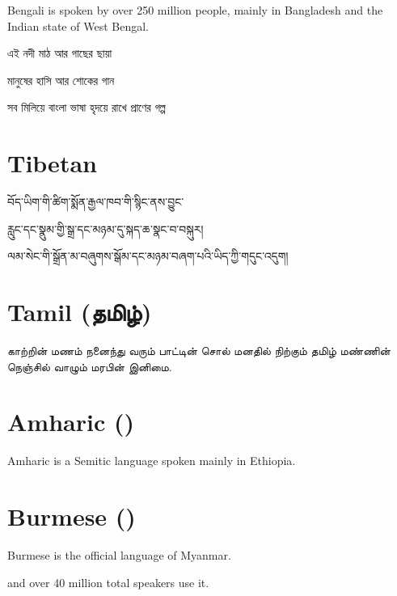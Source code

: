 \documentclass[a4paper,twoside]{article}
\begin{document}
Bengali is spoken by over 250 million people, mainly in Bangladesh and the Indian state of West Bengal.

\textbengali{এই নদী মাঠ আর গাছের ছায়া}

\textbengali{মানুষের হাসি আর শোকের গান}

\textbengali{সব মিলিয়ে বাংলা ভাষা হৃদয়ে রাখে প্রাণের গল্প}

\section{Tibetan}\label{tibetan}

\texttibetan{བོད་ཡིག་གི་ཚིག་སྨོན་རྒྱལ་ཁབ་གི་སྙིང་ནས་བྱུང་}

\texttibetan{རླུང་དང་སྣུམ་གྱི་སྒྲ་དང་མཉམ་དུ་སྐད་ཆ་སྣང་བ་བསྐུར།}

\texttibetan{ལམ་སེང་གི་སྒྲོན་མ་བཞུགས་སྒོམ་དང་མཉམ་བཞག་པའི་ཡིད་ཀྱི་གདུང་འདུག།}

\section{Tamil (\texttamil{தமிழ்})}\label{tamil-tmilll}

\texttamil{காற்றின் மணம் நனைந்து வரும்
பாட்டின் சொல் மனதில் நிற்கும்
தமிழ் மண்ணின் நெஞ்சில் வாழும் மரபின் இனிமை}.

\section{Amharic ()}\label{amharic-amaarenyaa}

Amharic is a Semitic language spoken mainly in Ethiopia.



\section{Burmese ()}\label{burmese-m-n-maa}

Burmese is the official language of Myanmar.

and over 40 million total speakers use it.



\end{document}
